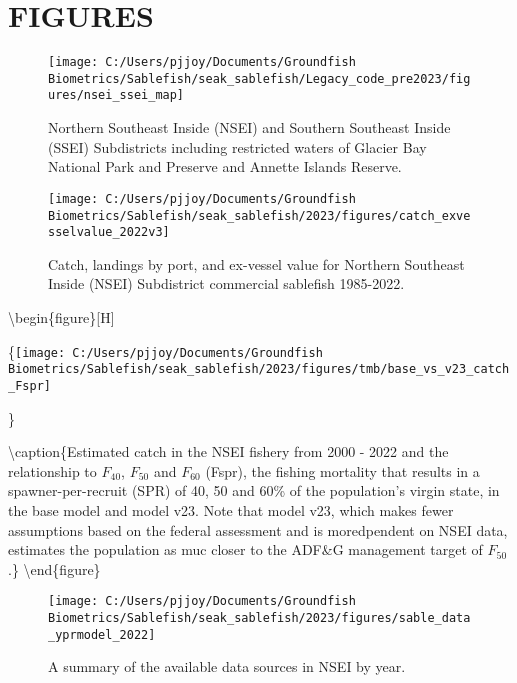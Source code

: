 \documentclass[
]{article}
\begin{document}
\newpage

\hypertarget{figures}{%
\section{FIGURES}\label{figures}}

\begin{figure}[H]

{\centering \texttt{[image: C:/Users/pjjoy/Documents/Groundfish Biometrics/Sablefish/seak\_sablefish/Legacy\_code\_pre2023/figures/nsei\_ssei\_map]} 

}

\caption{Northern Southeast Inside (NSEI) and Southern Southeast Inside (SSEI) Subdistricts including restricted waters of Glacier Bay National Park and Preserve and Annette Islands Reserve.}\label{fig:nseimap}
\end{figure}

\begin{figure}[H]

{\centering \texttt{[image: C:/Users/pjjoy/Documents/Groundfish Biometrics/Sablefish/seak\_sablefish/2023/figures/catch\_exvesselvalue\_2022v3]} 

}

\caption{Catch, landings by port, and ex-vessel value for Northern Southeast Inside (NSEI) Subdistrict commercial sablefish 1985-2022.}\label{fig:catch}
\end{figure}

\textbackslash begin\{figure\}{[}H{]}

\{\centering \texttt{[image: C:/Users/pjjoy/Documents/Groundfish Biometrics/Sablefish/seak\_sablefish/2023/figures/tmb/base\_vs\_v23\_catch\_Fspr]}

\}

\textbackslash caption\{Estimated catch in the NSEI fishery from 2000 -
2022 and the relationship to \(F_{40}\), \(F_{50}\) and \(F_{60}\)
(Fspr), the fishing mortality that results in a spawner-per-recruit
(SPR) of 40, 50 and 60\% of the population's virgin state, in the base
model and model v23. Note that model v23, which makes fewer assumptions
based on the federal assessment and is moredpendent on NSEI data,
estimates the population as muc closer to the ADF\&G management target
of \(F_{50}\).\}\label{fig:Fsprcomp} \textbackslash end\{figure\}

\begin{figure}[H]

{\centering \texttt{[image: C:/Users/pjjoy/Documents/Groundfish Biometrics/Sablefish/seak\_sablefish/2023/figures/sable\_data\_yprmodel\_2022]} 

}

\caption{A summary of the available data sources in NSEI by year.}\label{fig:datsrc}
\end{figure}
\end{document}
